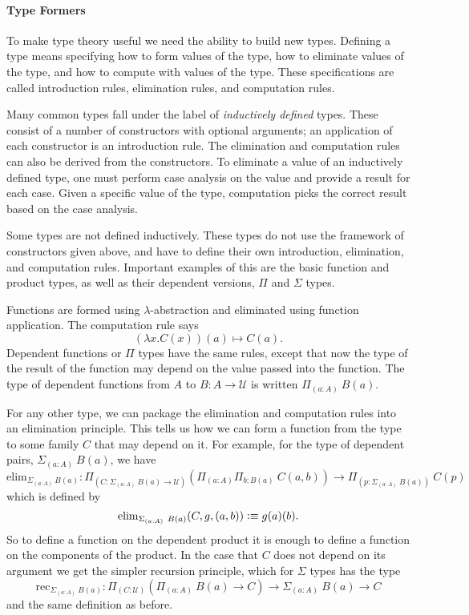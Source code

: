 \documentclass[12pt, parskip, DIV=14]{scrbook}
\newcommand{\defeq}{\vcentcolon\equiv}
\begin{document}
\paragraph{Type Formers}

To make type theory useful we need the ability to build new types. Defining a type means specifying how to form values of the type, how to eliminate values of the type, and how to compute with values of the type. These specifications are called introduction rules, elimination rules, and computation rules.

Many common types fall under the label of \textit{inductively defined} types. These consist of a number of constructors with optional arguments; an application of each constructor is an introduction rule. The elimination and computation rules can also be derived from the constructors. To eliminate a value of an inductively defined type, one must perform case analysis on the value and provide a result for each case. Given a specific value of the type, computation picks the correct result based on the case analysis.

Some types are not defined inductively. These types do not use the framework of constructors given above, and have to define their own introduction, elimination, and computation rules. Important examples of this are the basic function and product types, as well as their dependent versions, $\Pi$ and $\Sigma$ types.

Functions are formed using $\lambda$-abstraction and eliminated using function application. The computation rule says $$(\lambda x . C(x))(a) \mapsto C(a).$$ Dependent functions or $\Pi$ types have the same rules, except that now the type of the result of the function may depend on the value passed into the function. The type of dependent functions from $A$ to $B : A \to \mathcal{U}$ is written $\Pi_{(a : A)}~B(a)$.

For any other type, we can package the elimination and computation rules into an elimination principle. This tells us how we can form a function from the type to some family $C$ that may depend on it. For example, for the type of dependent pairs, $\Sigma_{(a : A)}~B(a)$, we have
$$\mathrm{elim}_{\Sigma_{(a : A)}~B(a)} : \Pi_{(C : \Sigma_{(a : A)}~B(a) \to \mathcal{U})}(\Pi_{(a : A)}\Pi_{b : B(a)}~C(a,b)) \to \Pi_{(p : \Sigma_{(a : A)}~B(a))}~C(p)$$ which is defined by $$\mathrm{elim}_{\Sigma_{(a : A)}~B(a)}(C,g,(a,b)) \defeq g(a)(b).$$ So to define a function on the dependent product it is enough to define a function on the components of the product. In the case that $C$ does not depend on its argument we get the simpler recursion principle, which for $\Sigma$ types has the type
$$\mathrm{rec}_{\Sigma_{(a : A)}~B(a)} : \Pi_{(C : \mathcal{U})}(\Pi_{(a : A)}~B(a) \to C) \to \Sigma_{(a : A)}~B(a) \to C$$ and the same definition as before.
\end{document}
